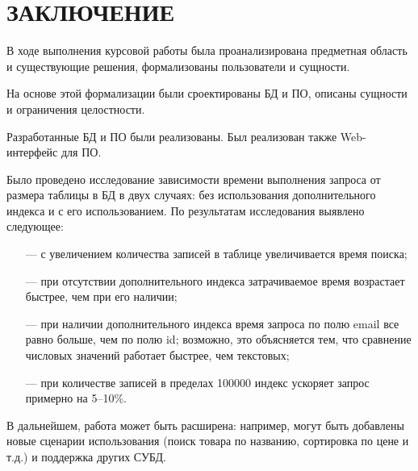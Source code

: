 \chapter*{\hfill{\centering ЗАКЛЮЧЕНИЕ}\hfill}

В ходе выполнения курсовой работы была проанализирована предметная область и существующие решения, формализованы пользователи и сущности.

На основе этой формализации были сроектированы БД и ПО, описаны сущности и ограничения целостности.

Разработанные БД и ПО были реализованы.
Был реализован также Web-интерфейс для ПО.

Было проведено исследование зависимости времени выполнения запроса от размера таблицы в БД в двух случаях: без использования дополнительного индекса и с его использованием.
По результатам исследования выявлено следующее:
\begin{itemize}
	\item[---] с увеличением количества записей в таблице увеличивается время поиска;
	\item[---] при отсутствии дополнительного индекса затрачиваемое время возрастает быстрее, чем при его наличии;
	\item[---] при наличии дополнительного индекса время запроса по полю email все равно больше, чем по полю id; возможно, это объясняется тем, что сравнение числовых значений работает быстрее, чем текстовых;
	\item[---] при количестве записей в пределах 100000 индекс ускоряет запрос примерно на 5--10\%.
\end{itemize}

В дальнейшем, работа может быть расширена: например, могут быть добавлены новые сценарии использования (поиск товара по названию, сортировка по цене и т.д.) и поддержка других СУБД.